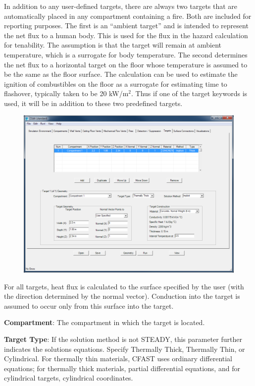 In addition to any user-defined targets, there are always two targets that are automatically placed in any compartment containing a fire. Both are included for reporting purposes. The first is an “ambient target” and is intended to represent the net flux to a human body. This is used for the flux in the hazard calculation for tenability. The assumption is that the target will remain at ambient temperature, which is a surrogate for body temperature. The second determines the net flux to a horizontal target on the floor whose temperature is assumed to be the same as the floor surface. The calculation can be used to estimate the ignition of combustibles on the floor as a surrogate for estimating time to flashover, typically taken to be 20 kW/m$^2$. Thus if one of the target keywords is used, it will be in addition to these two predefined targets.

\begin{figure}[h!]
\begin{center}
\includegraphics[width=6.5in]{FIGURES/Input_File/Target_Tab}
\end{center}
\end{figure}

For all targets, heat flux is calculated to the surface specified by the user (with the direction determined by the normal vector). Conduction into the target is assumed to occur only from this surface into the target.


\textbf{Compartment}: The compartment in which the target is located.

\textbf{Target Type}: If the solution method is not STEADY, this parameter further indicates the solutions equations.  Specify Thermally Thick, Thermally Thin, or Cylindrical.  For thermally thin materials, CFAST uses ordinary differential equations; for thermally thick materials, partial differential equations, and for cylindrical targets, cylindrical coordinates.

